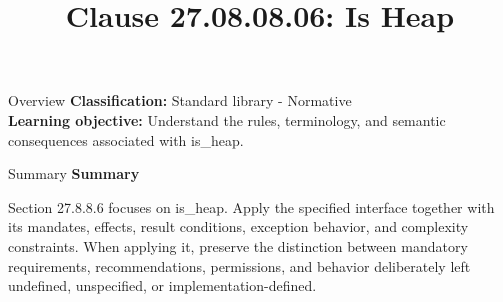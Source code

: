 \documentclass[10pt,letterpaper]{article}
\title{Clause 27.08.08.06: Is Heap}
\author{}
\date{}
\begin{document}
\maketitle
\begin{CornellOverviewBox}{Overview}
\textbf{Classification:} Standard library - Normative\\[2pt]
\textbf{Learning objective:} Understand the rules, terminology, and semantic consequences associated with is\_heap.
\end{CornellOverviewBox}\begin{CornellSummaryBox}{Summary}
{\sffamily\bfseries\color{Accent} Summary}\par\vspace{3pt}Section 27.8.8.6 focuses on is\_heap. Apply the specified interface together with its mandates, effects, result conditions, exception behavior, and complexity constraints. When applying it, preserve the distinction between mandatory requirements, recommendations, permissions, and behavior deliberately left undefined, unspecified, or implementation-defined.
\end{CornellSummaryBox}
\end{document}

